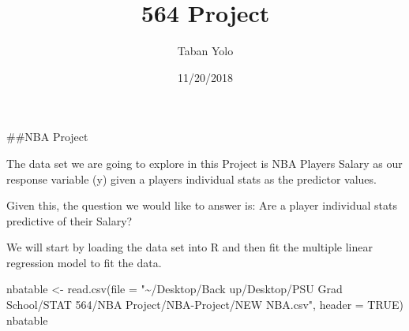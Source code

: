 \documentclass[
]{article}
\title{564 Project}
\author{Taban Yolo}
\date{11/20/2018}
\newenvironment{Shaded}{\begin{snugshade}}{\end{snugshade}}
\newcommand{\AttributeTok}[1]{\textcolor[rgb]{0.77,0.63,0.00}{#1}}
\newcommand{\ConstantTok}[1]{\textcolor[rgb]{0.00,0.00,0.00}{#1}}
\newcommand{\FunctionTok}[1]{\textcolor[rgb]{0.00,0.00,0.00}{#1}}
\newcommand{\NormalTok}[1]{#1}
\newcommand{\OtherTok}[1]{\textcolor[rgb]{0.56,0.35,0.01}{#1}}
\newcommand{\StringTok}[1]{\textcolor[rgb]{0.31,0.60,0.02}{#1}}
\begin{document}
\maketitle

\#\#NBA Project

The data set we are going to explore in this Project is NBA Players
Salary as our response variable (y) given a players individual stats as
the predictor values.

Given this, the question we would like to answer is: Are a player
individual stats predictive of their Salary?

We will start by loading the data set into R and then fit the multiple
linear regression model to fit the data.

\begin{Shaded}
\begin{Highlighting}[]
\NormalTok{nbatable }\OtherTok{\textless{}{-}} \FunctionTok{read.csv}\NormalTok{(}\AttributeTok{file =} \StringTok{"\textasciitilde{}/Desktop/Back up/Desktop/PSU Grad School/STAT 564/NBA Project/NBA{-}Project/NEW NBA.csv"}\NormalTok{, }\AttributeTok{header =} \ConstantTok{TRUE}\NormalTok{)}
\NormalTok{nbatable}
\end{Highlighting}
\end{Shaded}
\end{document}
